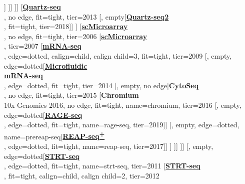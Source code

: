 \documentclass[12pt, a4]{article}
\begin{document}
\begin{center}
\begin{forest}
				[\href{https://science.sciencemag.org/content/360/6385/176}{\textbf{SPLiT-seq}}\\\citealt{rosenberg2018}, no edge, fit=tight, tier=2018]]
		]]
	]]
	[\href{https://genomebiology.biomedcentral.com/articles/10.1186/gb-2013-14-4-r31}{\textbf{Quartz-seq}}\\\citealt{sasagawa2013}, no edge, fit=tight, tier=2013
		[, empty[\href{https://genomebiology.biomedcentral.com/articles/10.1186/s13059-018-1407-3}{\textbf{Quartz-seq2}}\\\citealt{sasagawa2018}, fit=tight, tier=2018]]
	]
	[\href{https://academic.oup.com/nar/article/34/5/e42/1146394}{\textbf{scMicroarray}}\\\citealt{kurimoto2006}, no edge, fit=tight, tier=2006
	[\href{https://www.nature.com/articles/nprot.2007.79}{\textbf{scMicroarray}}\\\citealt{kurimoto2007}, tier=2007
	[\href{https://www.nature.com/articles/nmeth.1315}{\textbf{mRNA-seq}}\\\citealt{tang2009}, edge=dotted, calign=child, calign child=3, fit=tight, tier=2009
		[, empty, edge=dotted[\href{https://www.pnas.org/content/111/19/7048.long}{\textbf{Microfluidic}}\\\href{https://www.pnas.org/content/111/19/7048.long}
		{\textbf{mRNA-seq}}\\\citealt{streets2014}, edge=dotted, fit=tight, tier=2014
			[, empty, no edge[\href{https://science.sciencemag.org/content/347/6222/1258367.figures-only}{\textbf{CytoSeq}}\\\citealt{fan2015}, no edge, fit=tight, tier=2015
				[\textbf{Chromium}\\10x Genomics 2016, no edge, fit=tight, name=chromium, tier=2016
					[, empty, edge=dotted[\href{https://www.nature.com/articles/s41467-019-11049-4}{\textbf{RAGE-seq}}\\\citealt{singh2019}, edge=dotted, fit=tight, name=rage-seq, tier=2019]]
					[, empty, edge=dotted, name=prereap-seq[\href{https://www.nature.com/articles/nbt.3973}{\textbf{REAP-seq\textsuperscript{\textbf{\large{+}}}}}\\\citealt{peterson2017}, edge=dotted, fit=tight, name=reap-seq, tier=2017]]
				]
			]]
		]]
		[, empty, edge=dotted[\href{https://genome.cshlp.org/content/21/7/1160.long}{\textbf{STRT-seq}}\\\citealt{islam2011}, edge=dotted, fit=tight, name=strt-seq, tier=2011
			[\href{https://www.nature.com/articles/nprot.2012.022}{\textbf{STRT-seq}}\\\citealt{islam2012}, fit=tight, calign=child, calign child=2, tier=2012

\end{forest}
\end{center}
\end{document}
